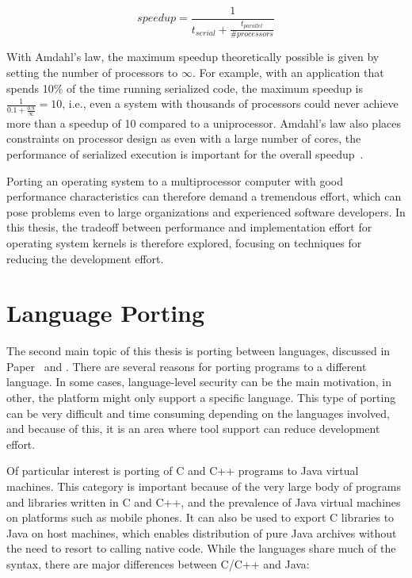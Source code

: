 \begin{displaymath}
  speedup = \frac{1}{t_{serial} + \frac{t_{parallel}}{\#processors}}
\end{displaymath}

With Amdahl's law, the maximum speedup theoretically possible is given by
setting the number of processors to $\infty$. For example, with an application that
spends 10\% of the time running serialized code, the maximum speedup is
$\frac{1}{0.1 + \frac{0.9}{\infty}} = 10$, i.e., even a system with
thousands of processors could never achieve more than a speedup of 10 compared
to a uniprocessor. Amdahl's law also places constraints on processor design as
even with a large number of cores, the performance of serialized execution is
important for the overall speedup~\cite{emer07single}.


Porting an operating system to a multiprocessor computer with good performance
characteristics can therefore demand a tremendous effort, which can pose
problems even to large organizations and experienced software developers. In
this thesis, the tradeoff between performance and implementation effort for
operating system kernels is therefore explored, focusing on techniques for
reducing the development effort.

\FloatBarrier

\section{Language Porting}
\label{sec:intro:language_porting}
The second main topic of this thesis is porting between languages, discussed
in Paper~ and . There are several
reasons for porting programs to a different language. In some cases,
language-level security can be the main motivation, in other, the platform
might only support a specific language. This type of porting can be very
difficult and time consuming depending on the languages involved, and because
of this, it is an area where tool support can reduce development effort.


Of particular interest is porting of C and C++ programs to Java virtual
machines. This category is important because of the very large body of
programs and libraries written in C and C++, and the prevalence of Java
virtual machines on platforms such as mobile phones. It can also be used to
export C libraries to Java on host machines, which enables distribution of
pure Java archives without the need to resort to calling native code. While
the languages share much of the syntax, there are major differences between
C/C++ and Java:

